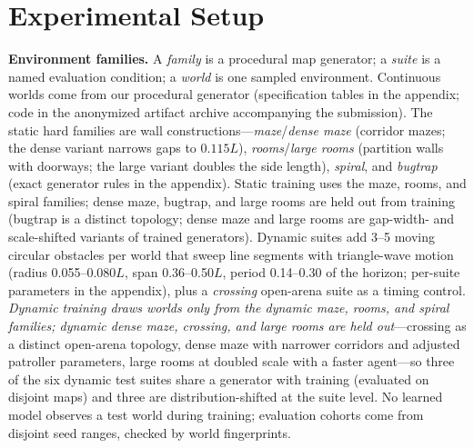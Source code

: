 \documentclass[letterpaper]{article} %
\begin{document}
\section{Experimental Setup}

\textbf{Environment families.} A \emph{family} is a procedural map generator; a \emph{suite} is a named evaluation condition; a \emph{world} is one sampled environment. Continuous worlds come from our procedural generator (specification tables in the appendix; code in the anonymized artifact archive accompanying the submission). The static hard families are wall constructions---\emph{maze}/\emph{dense maze} (corridor mazes; the dense variant narrows gaps to $0.115L$), \emph{rooms}/\emph{large rooms} (partition walls with doorways; the large variant doubles the side length), \emph{spiral}, and \emph{bugtrap} (exact generator rules in the appendix). Static training uses the maze, rooms, and spiral families; dense maze, bugtrap, and large rooms are held out from training (bugtrap is a distinct topology; dense maze and large rooms are gap-width- and scale-shifted variants of trained generators). Dynamic suites add 3--5 moving circular obstacles per world that sweep line segments with triangle-wave motion (radius 0.055--0.080$L$, span 0.36--0.50$L$, period 0.14--0.30 of the horizon; per-suite parameters in the appendix), plus a \emph{crossing} open-arena suite as a timing control. \emph{Dynamic training draws worlds only from the dynamic maze, rooms, and spiral families; dynamic dense maze, crossing, and large rooms are held out}---crossing as a distinct open-arena topology, dense maze with narrower corridors and adjusted patroller parameters, large rooms at doubled scale with a faster agent---so three of the six dynamic test suites share a generator with training (evaluated on disjoint maps) and three are distribution-shifted at the suite level. No learned model observes a test world during training; evaluation cohorts come from disjoint seed ranges, checked by world fingerprints.
\end{document}
